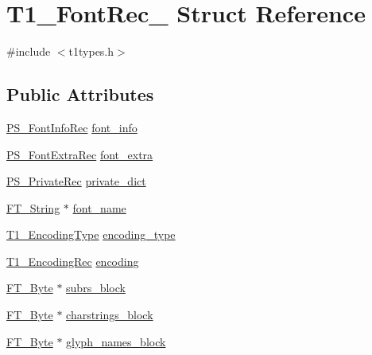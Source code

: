 \hypertarget{struct_t1___font_rec__}{\section{T1\-\_\-\-Font\-Rec\-\_\- Struct Reference}
\label{struct_t1___font_rec__}
}


{\ttfamily \#include $<$t1types.\-h$>$}

\subsection*{Public Attributes}
\begin{DoxyCompactItemize}
\item 
\hyperlink{t1tables_8h_aea24b6bd1ce2570170c42cfd8718895e}{P\-S\-\_\-\-Font\-Info\-Rec} \hyperlink{struct_t1___font_rec___a38098edc6279f539983e0d4694b9949a}{font\-\_\-info}
\item 
\hyperlink{t1types_8h_a14c3e20968f7f84b12c23acc9a54472d}{P\-S\-\_\-\-Font\-Extra\-Rec} \hyperlink{struct_t1___font_rec___a8f2f0990ef8ab29e961047b8c2ceca0d}{font\-\_\-extra}
\item 
\hyperlink{t1tables_8h_afe2ae1e8e05fe5f125ec128d7179a462}{P\-S\-\_\-\-Private\-Rec} \hyperlink{struct_t1___font_rec___a14386570a1b12e477407836e470a258f}{private\-\_\-dict}
\item 
\hyperlink{fttypes_8h_a9846214585359eb2ba6bbb0e6de30639}{F\-T\-\_\-\-String} $\ast$ \hyperlink{struct_t1___font_rec___a878fc12d0ddda382ffc09c27a7ed81ad}{font\-\_\-name}
\item 
\hyperlink{t1types_8h_a6f1290d847f7909e0dbdf33423382455}{T1\-\_\-\-Encoding\-Type} \hyperlink{struct_t1___font_rec___a20cb798239623daa4ac7fe833a2a9dc9}{encoding\-\_\-type}
\item 
\hyperlink{t1types_8h_a7c54ac1429e9c7c1610c7803a6dd94e8}{T1\-\_\-\-Encoding\-Rec} \hyperlink{struct_t1___font_rec___a78de0ca49e25ea59a2736ec5837c77b4}{encoding}
\item 
\hyperlink{fttypes_8h_a51f26183ca0c9f4af958939648caeccd}{F\-T\-\_\-\-Byte} $\ast$ \hyperlink{struct_t1___font_rec___a46675e2cba990def15e0ea01b11578a7}{subrs\-\_\-block}
\item 
\hyperlink{fttypes_8h_a51f26183ca0c9f4af958939648caeccd}{F\-T\-\_\-\-Byte} $\ast$ \hyperlink{struct_t1___font_rec___a8985630587cf6364837fe172391cfadb}{charstrings\-\_\-block}
\item 
\hyperlink{fttypes_8h_a51f26183ca0c9f4af958939648caeccd}{F\-T\-\_\-\-Byte} $\ast$ \hyperlink{struct_t1___font_rec___ae39e95d7c50028e8d4a9a24665b37e78}{glyph\-\_\-names\-\_\-block}

\end{DoxyCompactItemize}
